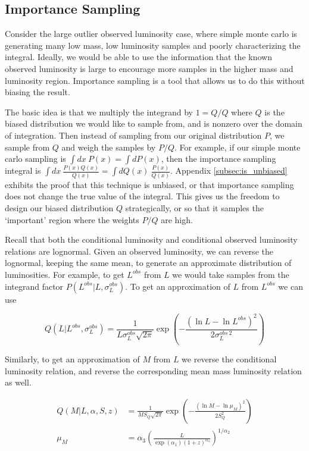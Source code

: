 \documentclass[\docopts]{\docclass}
\begin{document}
\subsection{Importance Sampling}
\label{subsec:is}

Consider the large outlier observed luminosity case, where simple monte carlo is generating many low mass, low luminosity samples and poorly characterizing the integral. 
Ideally, we would be able to use the information that the known observed luminosity is large to encourage more samples in the higher mass and luminosity region.
Importance sampling is a tool that allows us to do this without biasing the result. 

The basic idea is that we multiply the integrand by $1 = Q/Q$ where $Q$ is the biased distribution we would like to sample from, and is nonzero over the domain of integration.
Then instead of sampling from our original distribution $P$, we sample from $Q$ and weigh the samples by $P/Q$.
For example, if our simple monte carlo sampling is $\int dx\ P(x) = \int dP(x)$, then the importance sampling integral is $\int dx\ \frac{P(x)Q(x)}{Q(x)} = \int dQ(x)\ \frac{P(x)}{Q(x)}$.
Appendix \ref{subsec:is_unbiased} exhibits the proof that this technique is unbiased, or that importance sampling does not change the true value of the integral.
This gives us the freedom to design our biased distribution $Q$ strategically, or so that it samples the `important' region where the weights $P/Q$ are high.

Recall that both the conditional luminosity and conditional observed luminosity relations are lognormal.
Given an observed luminosity, we can reverse the lognormal, keeping the same mean, to generate an approximate distribution of luminosities.
For example, to get $L^{obs}$ from $L$ we would take samples from the integrand factor $P(L^{obs}| L, \sigma_L^{obs})$.
To get an approximation of $L$ from $L^{obs}$ we can use 

$$Q(L|L^{obs}, \sigma_L^{obs}) = \frac{1}{L\sigma_L^{obs}\sqrt{2\pi}}\exp\left(-\frac{(\ln L - \ln L^{obs})^2}{2\sigma_L^{obs\ 2}}\right)$$

Similarly, to get an approximation of $M$ from $L$ we reverse the conditional luminosity relation, and reverse the corresponding mean mass luminosity relation as well.

\begin{align*}
Q(M|L,\alpha,S,z) &= \frac{1}{MS_Q\sqrt{2\pi}}\exp\left(-\frac{(\ln M - \ln \mu_M)^2}{2S_Q^{2}}\right)\\
\mu_M &= \alpha_3 \left(\frac{L}{\exp(\alpha_1)(1+z)^{\alpha_4}}\right)^{1/\alpha_2}\\
\end{align*}
\end{document}
